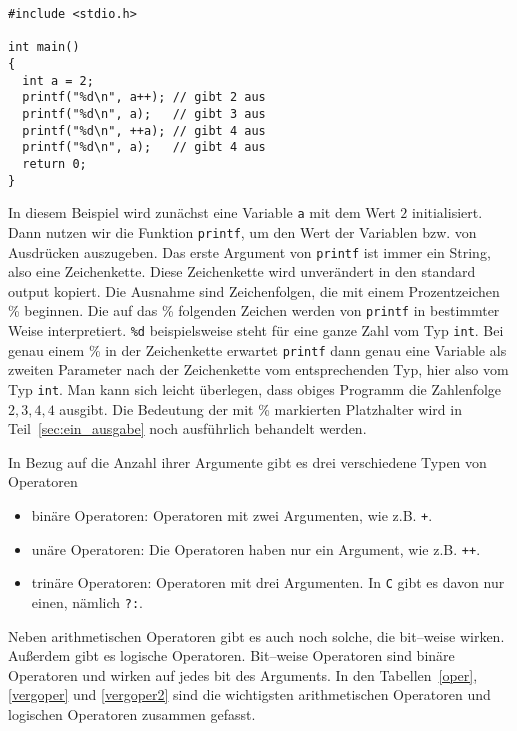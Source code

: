 \begin{minipage}{\linewidth}
\begin{lstlisting}
#include <stdio.h>

int main()
{
  int a = 2;
  printf("%d\n", a++); // gibt 2 aus
  printf("%d\n", a);   // gibt 3 aus
  printf("%d\n", ++a); // gibt 4 aus
  printf("%d\n", a);   // gibt 4 aus
  return 0;
}
\end{lstlisting}
\end{minipage}
In diesem Beispiel wird zunächst eine Variable \texttt{a} mit dem Wert $2$ initialisiert.\index{\texttt{++}}
Dann nutzen wir die Funktion \texttt{printf}, um den Wert der Variablen bzw. von Ausdrücken auszugeben. 
Das erste Argument von \texttt{printf} ist immer ein String, also eine Zeichenkette.
Diese Zeichenkette wird unverändert in den standard output kopiert.
Die Ausnahme sind Zeichenfolgen, die mit einem Prozentzeichen \% beginnen.
Die auf das \% folgenden Zeichen werden von \texttt{printf} in bestimmter Weise interpretiert.
\verb|%d| beispielsweise steht für eine ganze Zahl vom Typ \texttt{int}. 
Bei genau einem \% in der Zeichenkette erwartet \texttt{printf} dann genau eine Variable als zweiten Parameter nach der Zeichenkette vom entsprechenden Typ, hier also vom Typ \texttt{int}.
Man kann sich leicht überlegen, dass obiges Programm die Zahlenfolge $2,3,4,4$ ausgibt.
Die Bedeutung der mit \% markierten Platzhalter wird in Teil~\ref{sec:ein_ausgabe} noch ausführlich behandelt werden.

In Bezug auf die Anzahl ihrer Argumente gibt es drei verschiedene Typen von Operatoren
\begin{itemize}
\item binäre Operatoren: Operatoren mit zwei Argumenten, wie z.B. \verb|+|.
\item unäre Operatoren: Die Operatoren haben nur ein Argument, wie z.B. \verb|++|.
\item trinäre Operatoren: Operatoren mit drei Argumenten. In \texttt{C} gibt es davon nur einen, nämlich \verb|?:|.%
\end{itemize} 
Neben arithmetischen Operatoren gibt es auch noch solche, die bit--weise wirken. 
Außerdem gibt es logische Operatoren.
Bit--weise Operatoren sind binäre Operatoren und wirken auf jedes bit des Arguments.
In den Tabellen~\ref{oper}, \ref{vergoper} und \ref{vergoper2} sind die wichtigsten arithmetischen Operatoren und logischen Operatoren zusammen gefasst. 

